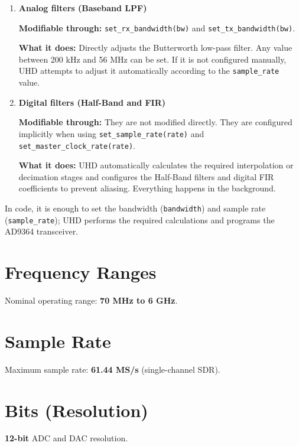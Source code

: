 \documentclass[11pt]{article}
\begin{document}
\begin{enumerate}
    \item \textbf{Analog filters (Baseband LPF)}

    \textbf{Modifiable through:} \texttt{set\_rx\_bandwidth(bw)} and \texttt{set\_tx\_bandwidth(bw)}.

    \textbf{What it does:} Directly adjusts the Butterworth low-pass filter. Any value between 200 kHz and 56 MHz can be set. If it is not configured manually, UHD attempts to adjust it automatically according to the \texttt{sample\_rate} value.

    \item \textbf{Digital filters (Half-Band and FIR)}

    \textbf{Modifiable through:} They are not modified directly. They are configured implicitly when using \texttt{set\_sample\_rate(rate)} and \texttt{set\_master\_clock\_rate(rate)}.

    \textbf{What it does:} UHD automatically calculates the required interpolation or decimation stages and configures the Half-Band filters and digital FIR coefficients to prevent aliasing. Everything happens in the background.
\end{enumerate}

In code, it is enough to set the bandwidth (\texttt{bandwidth}) and sample rate (\texttt{sample\_rate}); UHD performs the required calculations and programs the AD9364 transceiver.

\section{Frequency Ranges}
Nominal operating range: \textbf{70 MHz to 6 GHz}.

\section{Sample Rate}
Maximum sample rate: \textbf{61.44 MS/s} (single-channel SDR).

\section{Bits (Resolution)}
\textbf{12-bit} ADC and DAC resolution.
\end{document}

